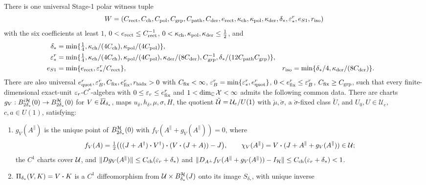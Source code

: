 \begin{lemma}\label{lem:stage1-extra-fixed-class}
There is one universal Stage-1 polar witness tuple
\[
 W=(C_{\rm rect},C_{\rm ch},C_{\rm pol},C_{\rm grp},C_{\rm path},C_{\rm der},
 e_{\rm rect},\kappa_{\rm ch},\kappa_{\rm pol},\kappa_{\rm der},
 \delta_*,\varepsilon_*^r,e_{S1},r_{\rm iso})
\]
with the six coefficients at least $1$, $0<e_{\rm rect}\le C_{\rm rect}^{-1}$,
$0<\kappa_{\rm ch},\kappa_{\rm pol},\kappa_{\rm der}\le\tfrac12$, and
\begin{align*}
 \delta_*&=\min\{\tfrac14,\kappa_{\rm ch}/(4C_{\rm ch}),
                         \kappa_{\rm pol}/(4C_{\rm pol})\},\\
 \varepsilon_*^r&=\min\{\tfrac14,\kappa_{\rm ch}/(4C_{\rm ch}),
 \kappa_{\rm pol}/(4C_{\rm pol}),\kappa_{\rm der}/(8C_{\rm der}),
 C_{\rm grp}^{-1},\delta_*/(12C_{\rm path}C_{\rm grp})\},\\
 e_{S1}&=\min\{e_{\rm rect},\varepsilon_*^r/C_{\rm rect}\},
 &r_{\rm iso}&=\min\{\delta_*/4,\kappa_{\rm der}/(8C_{\rm der})\}.
\end{align*}
There are also universal $e_{\rm quot}^r,\varepsilon_B^r,C_{\rm fix},e_{\rm fix}^r,r_{\rm bidx}>0$
with $C_{\rm fix}<\infty$, $\varepsilon_B^r=\min\{\varepsilon_*^r,e_{\rm quot}^r\}$,
$0<e_{\rm fix}^r\le\varepsilon_B^r$, $C_{\rm fix}\ge C_{\rm grp}$, such that every
finite-dimensional exact-unit $\varepsilon_r$-$C^*$-algebra with
$0\le\varepsilon_r\le e_{\rm fix}^r$ and $1<\dim_{\mathbb C}\mathcal X<\infty$ admits the following
common data.  There are charts $g_V:B_{2\delta_*}^{i\mathcal H}(0)\to
B_{2\delta_*}^{\mathcal H}(0)$ for $V\in\overline{\mathcal U}_{\delta_*}$, maps
$u_\delta,h_\delta,\mu,\sigma,H$, the quotient $\breve{\mathcal U}=\mathcal U_e/U(1)$ with
$\breve\mu,\breve\sigma$, a $\breve\sigma$-fixed class $\breve U$, and
$U_0,U\in\mathcal U_e$, $c,a\in U(1)$, satisfying:
\begin{enumerate}
\item[(A$_2$)] $g_V(A^\parallel)$ is the unique point of $B_{2\delta_*}^{\mathcal H}(0)$ with
$f_V(A^\parallel+g_V(A^\parallel))=0$, where
\[
 f_V(A)=\tfrac12\bigl(((J+A^{\dagger})\mathbin{\bm{\cdot}} V^{\dagger})\mathbin{\bm{\cdot}}(V\mathbin{\bm{\cdot}}(J+A))-J\bigr),\qquad
 \chi_V(A^\parallel)=V\mathbin{\bm{\cdot}}(J+A^\parallel+g_V(A^\parallel))\in\mathcal U;
\]
the $C^1$ charts cover $\mathcal U$, and
$\lVert Dg_V(A^\parallel)\rVert\le C_{\rm ch}(\varepsilon_r+\delta_*)$ and
$\lVert D_{A^\perp}f_V(A^\parallel+g_V(A^\parallel))-I_{\mathcal H}\rVert
 \le C_{\rm ch}(\varepsilon_r+\delta_*)<1$.
\item[(A$_4$)] $\Pi_{\delta_*}(V,K)=V\mathbin{\bm{\cdot}} K$ is a $C^1$ diffeomorphism from
$\mathcal U\times B_{\delta_*}^{\mathcal H}(J)$ onto its image $S_{\delta_*}$, with unique inverse

\end{enumerate}
\end{lemma}
